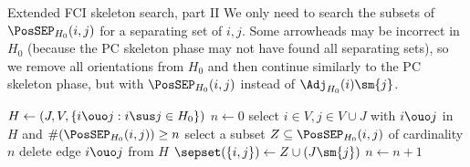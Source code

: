 \begin{frame}{Extended FCI skeleton search, part II}
We only need to search the subsets of $\PosSEP_{H_0}(i,j)$ for a separating set of $i,j$.
Some arrowheads may be incorrect in $H_0$ (because the PC skeleton phase may not have found all separating sets), so we remove all orientations from $H_0$ and then continue similarly to the PC skeleton phase, but with $\PosSEP_{H_0}(i,j)$ instead of $\Adj_{H_0}(i)\sm\{j\}$.

\bigskip
  \footnotesize
  \begin{algorithmic}[1]
    \setcounter{ALG@line}{11}
    \State $H \leftarrow (J,V,\{i \ouo j : i \sus j \in H_0 \})$ 
  \State $n \leftarrow 0$
    \Repeat {}
    \Repeat
    \State select $i \in V, j \in V \cup J$ with $i \ouo j$ in $H$ and $\#(\PosSEP_{H_0}(i,j)) \ge n$
    \State select a subset $Z \subseteq \PosSEP_{H_0}(i,j)$ of cardinality $n$
      \State delete edge $i \ouo j$ from $H$
      \State $\sepset(\{i,j\}) \leftarrow Z \cup (J \sm \{j\})$
    \EndIf
    \State $n \leftarrow n + 1$
  \end{algorithmic}
\end{frame}

